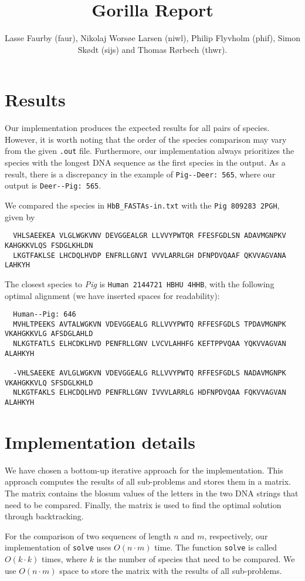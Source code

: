 \documentclass{tufte-handout}
\title{Gorilla Report}
\author{Lasse Faurby (faur), Nikolaj Worsøe Larsen (niwl), Philip Flyvholm (phif), Simon Skødt (sijs) and Thomas Rørbech (thwr).}
\begin{document}
  \maketitle
  
  \section{Results}
  \begin{fullwidth}
      
  Our implementation produces the expected results for all pairs of species. However, it is worth noting that the order of the species comparison may vary from the given \texttt{.out} file. Furthermore, our implementation always prioritizes the species with the longest DNA sequence as the first species in the output. As a result, there is a discrepancy in the example of \verb!Pig--Deer: 565!, where our output is \verb!Deer--Pig: 565!.

  We compared the species in \verb!HbB_FASTAs-in.txt!
  with the \verb!Pig 809283 2PGH!, given by\medskip

  \begin{verbatim}
  VHLSAEEKEA VLGLWGKVNV DEVGGEALGR LLVVYPWTQR FFESFGDLSN ADAVMGNPKV KAHGKKVLQS FSDGLKHLDN 
  LKGTFAKLSE LHCDQLHVDP ENFRLLGNVI VVVLARRLGH DFNPDVQAAF QKVVAGVANA LAHKYH
  \end{verbatim}

  \noindent
  The closest species to \emph{Pig} is \verb!Human 2144721 HBHU 4HHB!, with the following optimal alignment (we have inserted spaces for readability):

  \medskip
  \begin{verbatim}
  Human--Pig: 646
  MVHLTPEEKS AVTALWGKVN VDEVGGEALG RLLVVYPWTQ RFFESFGDLS TPDAVMGNPK VKAHGKKVLG AFSDGLAHLD 
  NLKGTFATLS ELHCDKLHVD PENFRLLGNV LVCVLAHHFG KEFTPPVQAA YQKVVAGVAN ALAHKYH
  
  -VHLSAEEKE AVLGLWGKVN VDEVGGEALG RLLVVYPWTQ RFFESFGDLS NADAVMGNPK VKAHGKKVLQ SFSDGLKHLD 
  NLKGTFAKLS ELHCDQLHVD PENFRLLGNV IVVVLARRLG HDFNPDVQAA FQKVVAGVAN ALAHKYH
  \end{verbatim}

  \section{Implementation details}
  We have chosen a bottom-up iterative approach for the implementation. This approach computes the results of all sub-problems and stores them in a matrix. The matrix contains the blosum values of the letters in the two DNA strings that need to be compared. Finally, the matrix is used to find the optimal solution through backtracking.
        
  For the comparison of two sequences of length $n$ and $m$, respectively, our implementation of \texttt{solve} uses $O(n \cdot m)$ time. The function \texttt{solve} is called $O(k \cdot k)$ times, where $k$ is the number of species that need to be compared. We use $O(n \cdot m)$ space to store the matrix with the results of all sub-problems.
  \end{fullwidth}
\end{document}
